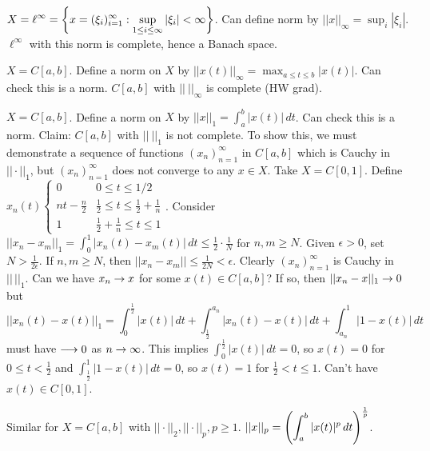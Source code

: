 \documentclass[]{article}
\begin{document}
\begin{recall}
	$\displaystyle X = \ell^\infty = \left\{ x=(\xi_i)_{i=1}^\infty : \sup_{1\leq i\leq\infty}|\xi_i|<\infty \right\}$.
	Can define norm by $\displaystyle||x||_\infty = \sup_i|\xi_i|$.
	$\ell^\infty$ with this norm is complete, hence a Banach space.
\end{recall}
\begin{example}
	$X = C[a,b]$.
	Define a norm on $X$ by $\displaystyle||x(t)||_\infty = \max_{a\leq t\leq b}|x(t)|$.
	Can check this is a norm. $C[a,b]$ with $||\ ||_\infty$ is complete (HW grad).
\end{example}
\begin{example}
	$X = C[a,b]$. Define a norm on $X$ by $||x||_1 = \int_a^b|x(t)|\,dt$.
	Can check this is a norm.
	Claim: $C[a,b]$ with $||\ ||_1$ is not complete.
	To show this, we must demonstrate a sequence of functions $(x_n)_{n=1}^\infty$ in $C[a,b]$ which is Cauchy in $||\cdot ||_1$, but $(x_n)_{n=1}^\infty$ does not converge to any $x\in X$.
Take $X = C[0,1]$. Define $x_n(t) \begin{cases} 0 & 0\leq t\leq 1/2 \\ nt-\frac n2 & \frac12 \leq t \leq \frac12+\frac1n \\ 1 & \frac12+\frac1n\leq t\leq 1 \end{cases}$.
		Consider $\displaystyle||x_n-x_m||_1 = \int_0^1|x_n(t)-x_m(t)|\,dt \leq \frac12\cdot\frac1N$ for $n,m\geq N$.
		Given $\epsilon>0$, set $N>\frac1{2\epsilon}$.
		If $n,m\geq N$, then $||x_n-x_m||\leq\frac1{2N}<\epsilon$.
		Clearly $(x_n)_{n=1}^\infty$ is Cauchy in $||\,||_1$.
		Can we have $x_n\rightarrow x$ for some $x(t)\in C[a,b]$?
		If so, then $||x_n-x||_1\rightarrow 0$ but $$||x_n(t)-x(t)||_1 = \int_0^\frac12 |x(t)|\, dt + \int_\frac12^{a_n} |x_n(t)-x(t)|\,dt + \int_{a_n}^1 |1-x(t)|\,dt$$ must have $\longrightarrow 0$ as $n\rightarrow\infty$.
		This implies $\int_0^\frac12|x(t)|\,dt=0$, so $x(t)=0$ for $0\leq t<\frac12$ and $\int_\frac12^1 |1-x(t)|\, dt = 0$, so $x(t) = 1$ for $\frac12<t\leq 1$.
		Can't have $x(t)\in C[0,1]$.
\end{example}
\begin{example}
	Similar for $X=C[a,b]$ with $||\cdot||_2,||\cdot||_p,p\geq 1$.
	$\displaystyle ||x||_p = \left(\int_a^b|x(t)|^p\,dt\right)^\frac1p$.
\end{example}
\end{document}
